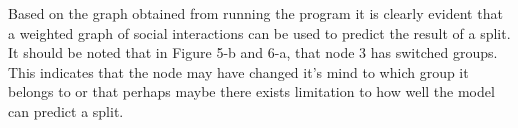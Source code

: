 \documentclass[12pt,letterpaper]{article}
\begin{document}
\newpage
Based on the graph obtained from running the program it is clearly evident that a weighted graph of social interactions can be used to predict the result of a split. It should be noted that in Figure 5-b and 6-a, that node 3 has switched groups. This indicates that the node may have changed it's mind to which group it belongs to or that perhaps maybe there exists limitation to how well the model can predict a split. 

\newpage 
\printbibliography
\end{document}
